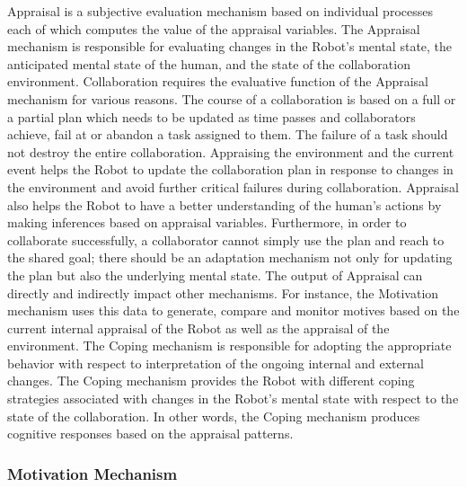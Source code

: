 Appraisal is a subjective evaluation mechanism based on individual processes
each of which computes the value of the appraisal variables. The Appraisal
mechanism is responsible for evaluating changes in the Robot's mental state, the
anticipated mental state of the human, and the state of the collaboration
environment. Collaboration requires the evaluative function of the Appraisal
mechanism for various reasons. The course of a collaboration is based on a full
or a partial plan which needs to be updated as time passes and collaborators
achieve, fail at or abandon a task assigned to them. The failure of a task
should not destroy the entire collaboration. Appraising the environment and the
current event helps the Robot to update the collaboration plan in response to
changes in the environment and avoid further critical failures during
collaboration. Appraisal also helps the Robot to have a better understanding of
the human's actions by making inferences based on appraisal variables.
Furthermore, in order to collaborate successfully, a collaborator cannot simply
use the plan and reach to the shared goal; there should be an adaptation
mechanism not only for updating the plan but also the underlying mental state.
The output of Appraisal can directly and indirectly impact other mechanisms. For
instance, the Motivation mechanism uses this data to generate, compare and
monitor motives based on the current internal appraisal of the Robot as well as
the appraisal of the environment. The Coping mechanism is responsible for
adopting the appropriate behavior with respect to interpretation of the ongoing
internal and external changes. The Coping mechanism provides the Robot with
different coping strategies associated with changes in the Robot's mental state
with respect to the state of the collaboration. In other words, the Coping
mechanism produces cognitive responses based on the appraisal patterns.

\subsubsection{Motivation Mechanism}
\label{sec:motivation-mech}

